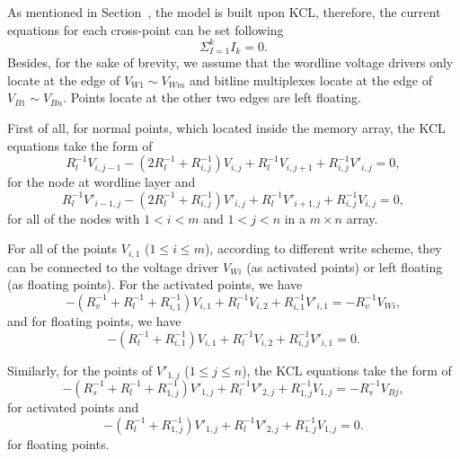 \label{sec:app}

As mentioned in Section~\label{sec:model}, the model is built upon KCL,
therefore, the current equations for each cross-point can be set following
\begin{equation}\label{equ:KCL0}
 {\Sigma}_{I=1}^kI_k=0.
\end{equation}
Besides, for the sake of brevity, we assume that the wordline voltage
drivers only locate at the edge of $V_{W1} \sim V_{Wm}$ and bitline
multiplexes locate at the edge of $V_{B1} \sim V_{Bn}$. Points locate at
the other two edges are left floating.

First of all, for normal points, which located inside the memory array,
the KCL equations take the form of
\begin{equation}\label{equ:KCL1}
R_l^{-1}V_{i,j-1} -(2R_l^{-1}+R_{i,j}^{-1})V_{i,j}+ R_l^{-1}V_{i,j+1}+R_{i,j}^{-1}V'_{i,j}=0,
\end{equation}
for the node at wordline layer and
\begin{equation}\label{equ:KCL2}
R_l^{-1}V'_{i-1,j} -(2R_l^{-1}+R_{i,j}^{-1})V'_{i,j}+ R_l^{-1}V'_{i+1,j}+R_{i,j}^{-1}V_{i,j}=0,
\end{equation}
for all of the nodes with $1<i<m$ and $1<j<n$ in a $m \times n$ array.

For all of the points $V_{i,1}$ ($1\leq i\leq m$), according to different
write scheme, they can be connected to the voltage driver $V_{Wi}$ (as
activated points) or left floating (as floating points). For the activated
points, we have
\begin{equation}\label{equ:KCL3}
 -(R_v^{-1}+R_l^{-1}+R_{i,1}^{-1})V_{i,1}+ R_l^{-1}V_{i,2}+R_{i,1}^{-1}V'_{i,1}=-R_v^{-1}V_{Wi},
\end{equation}
and for floating points, we have
\begin{equation}\label{equ:KCL4}
 -(R_l^{-1}+R_{i,1}^{-1})V_{i,1}+ R_l^{-1}V_{i,2}+R_{i,j}^{-1}V'_{i,1}=0.
\end{equation}

Similarly, for the points of $V'_{1,j}$ ($1\leq j\leq n$), the KCL
equations take the form of
\begin{equation}\label{equ:KCL5}
 -(R_s^{-1}+R_l^{-1}+R_{1,j}^{-1})V'_{1,j}+ R_l^{-1}V'_{2,j}+R_{1,j}^{-1}V_{1,j}=-R_s^{-1}V_{Bj},
\end{equation}
for activated points and
\begin{equation}\label{equ:KCL6}
 -(R_l^{-1}+R_{1,j}^{-1})V'_{1,j}+ R_l^{-1}V'_{2,j}+R_{1,j}^{-1}V_{1,j}=0.
\end{equation}
for floating points.


